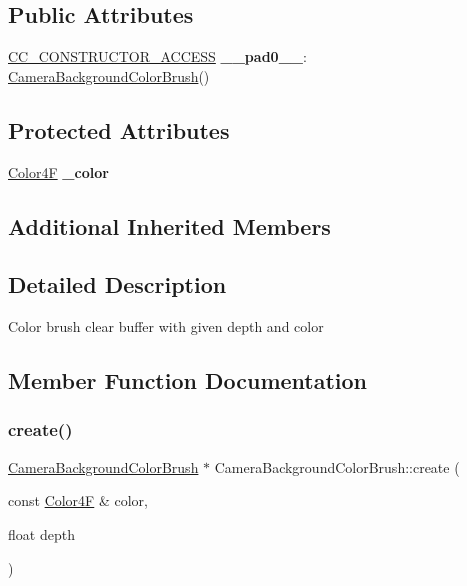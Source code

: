 \subsection*{Public Attributes}
\begin{DoxyCompactItemize}
\item 
\mbox{\label{classCameraBackgroundColorBrush_a50bc53495adabd62a50d8e5a021c4e1d}} 
\hyperlink{_2cocos2d_2cocos_2base_2ccConfig_8h_a25ef1314f97c35a2ed3d029b0ead6da0}{C\+C\+\_\+\+C\+O\+N\+S\+T\+R\+U\+C\+T\+O\+R\+\_\+\+A\+C\+C\+E\+SS} {\bfseries \+\_\+\+\_\+pad0\+\_\+\+\_\+}\+: \hyperlink{classCameraBackgroundColorBrush}{Camera\+Background\+Color\+Brush}()
\end{DoxyCompactItemize}
\subsection*{Protected Attributes}
\begin{DoxyCompactItemize}
\item 
\mbox{\label{classCameraBackgroundColorBrush_a6b579fad29c7ccac0cf791ded21bc02a}} 
\hyperlink{structColor4F}{Color4F} {\bfseries \+\_\+color}
\end{DoxyCompactItemize}
\subsection*{Additional Inherited Members}


\subsection{Detailed Description}
Color brush clear buffer with given depth and color 

\subsection{Member Function Documentation}
\mbox{\label{classCameraBackgroundColorBrush_ad4b910ac4cab440aebc91c800f8b60d6}} 
\subsubsection{\texorpdfstring{create()}{create()}\hspace{0.1cm}{\footnotesize\ttfamily [1/2]}}
{\footnotesize\ttfamily \hyperlink{classCameraBackgroundColorBrush}{Camera\+Background\+Color\+Brush} $\ast$ Camera\+Background\+Color\+Brush\+::create (\begin{DoxyParamCaption}\item[{const \hyperlink{structColor4F}{Color4F} \&}]{color,  }\item[{float}]{depth }\end{DoxyParamCaption})\hspace{0.3cm}{\ttfamily [static]}}

